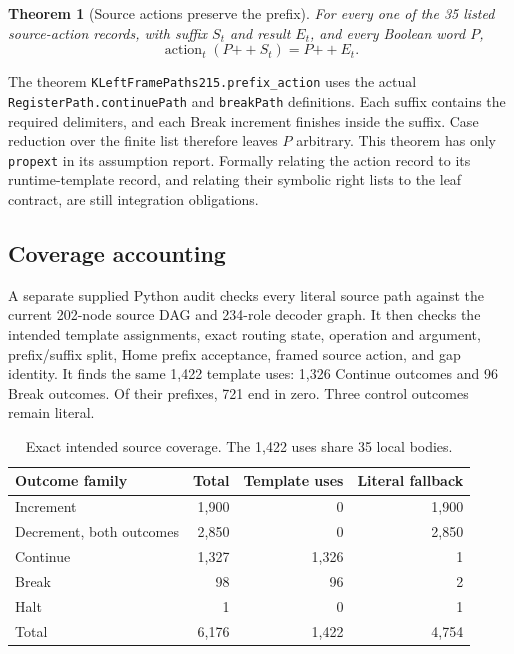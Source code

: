 \documentclass[11pt,letterpaper]{article}
\newtheorem{theorem}{Theorem}[section]
\theoremstyle{definition}
\theoremstyle{remark}
\newcommand{\code}[1]{\texttt{#1}}
\begin{document}
\begin{theorem}[Source actions preserve the prefix]
For every one of the 35 listed source-action records, with suffix $S_t$
and result $E_t$, and every Boolean word $P$,
\[
 \operatorname{action}_t(P\mathbin{++}S_t)=P\mathbin{++}E_t.
\]
\end{theorem}
The theorem \code{KLeftFramePaths215.prefix\_action} uses the actual
\code{RegisterPath.continuePath} and \code{breakPath} definitions. Each
suffix contains the required delimiters, and each Break increment finishes
inside the suffix. Case reduction over the finite list therefore leaves
$P$ arbitrary. This theorem has only \code{propext} in its assumption
report. Formally relating the action record to its runtime-template record,
and relating their symbolic right lists to the leaf contract, are still
integration obligations.

\subsection{Coverage accounting}

A separate supplied Python audit checks every literal source path against
the current 202-node source DAG and 234-role decoder graph. It then checks
the intended template assignments, exact routing state, operation and
argument, prefix/suffix split, Home prefix acceptance, framed source action,
and gap identity. It finds the same 1,422 template uses: 1,326 Continue
outcomes and 96 Break outcomes. Of their prefixes, 721 end in zero. Three
control outcomes remain literal.

\begin{table}[ht]
\centering\small
\begin{tabular}{@{}lrrr@{}}
\toprule
Outcome family & Total & Template uses & Literal fallback\\
\midrule
Increment & 1,900 & 0 & 1,900\\
Decrement, both outcomes & 2,850 & 0 & 2,850\\
Continue & 1,327 & 1,326 & 1\\
Break & 98 & 96 & 2\\
Halt & 1 & 0 & 1\\
\midrule
Total & 6,176 & 1,422 & 4,754\\
\bottomrule
\end{tabular}
\caption{Exact intended source coverage. The 1,422 uses share 35 local bodies.}
\label{tab:coverage}
\end{table}
\end{document}
